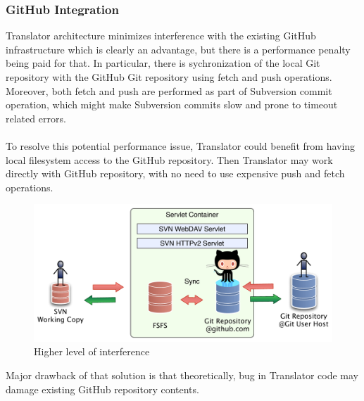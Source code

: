 \subsubsection{GitHub Integration}

Translator architecture minimizes interference with the existing GitHub infrastructure which is clearly an advantage, but there is a performance penalty being paid for that.
In particular, there is sychronization of the local Git repository with the GitHub Git repository using fetch and push operations. Moreover, both fetch and push are 
performed as part of Subversion commit operation, which might make Subversion commits slow and prone to timeout related errors.
\\\\
To resolve this potential performance issue, Translator could benefit from having local filesystem access to the GitHub repository. Then Translator may work directly with GitHub repository,
with no need to use expensive push and fetch operations.
\begin{figure}[!h]
\includegraphics[width=\linewidth]{img/servlet/components_not_that_safe.pdf}
\caption{Higher level of interference}
\label{translator_components_pic2}
\end{figure}
Major drawback of that solution is that theoretically, bug in Translator code may damage existing GitHub repository contents.